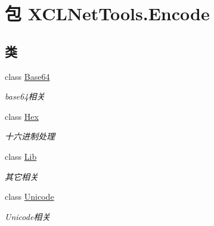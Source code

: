 \hypertarget{namespace_x_c_l_net_tools_1_1_encode}{\section{包 X\-C\-L\-Net\-Tools.\-Encode}
\label{namespace_x_c_l_net_tools_1_1_encode}
}
\subsection*{类}
\begin{DoxyCompactItemize}
\item 
class \hyperlink{class_x_c_l_net_tools_1_1_encode_1_1_base64}{Base64}
\begin{DoxyCompactList}\small\item\em base64相关 \end{DoxyCompactList}\item 
class \hyperlink{class_x_c_l_net_tools_1_1_encode_1_1_hex}{Hex}
\begin{DoxyCompactList}\small\item\em 十六进制处理 \end{DoxyCompactList}\item 
class \hyperlink{class_x_c_l_net_tools_1_1_encode_1_1_lib}{Lib}
\begin{DoxyCompactList}\small\item\em 其它相关 \end{DoxyCompactList}\item 
class \hyperlink{class_x_c_l_net_tools_1_1_encode_1_1_unicode}{Unicode}
\begin{DoxyCompactList}\small\item\em Unicode相关 \end{DoxyCompactList}\end{DoxyCompactItemize}

